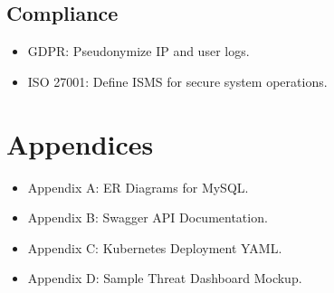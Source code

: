 \documentclass[12pt]{article}
\begin{document}
\subsection{Compliance}
\begin{itemize}
    \item GDPR: Pseudonymize IP and user logs.
    \item ISO 27001: Define ISMS for secure system operations.
\end{itemize}

\section{Appendices}
\begin{itemize}
    \item Appendix A: ER Diagrams for MySQL.
    \item Appendix B: Swagger API Documentation.
    \item Appendix C: Kubernetes Deployment YAML.
    \item Appendix D: Sample Threat Dashboard Mockup.
\end{itemize}
\end{document}
